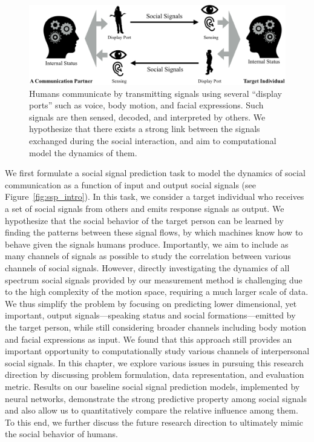 \begin{figure}[t]
	\includegraphics[width=\linewidth]{ssp_fig/socialcomm}
	\caption{Humans communicate by transmitting signals using several ``display ports'' such as voice, body motion, and facial expressions. Such signals are then sensed, decoded, and interpreted by others. We hypothesize that there exists a strong link between the signals exchanged during the social interaction, and aim to computational model the dynamics of them.}
	\label{fig:ssp_intro_flow}
\end{figure}

We first formulate a social signal prediction task to model the dynamics of social communication as a function of input and output social signals (see Figure~\ref{fig:ssp_intro}). In this task, we consider a target individual who receives a set of social signals from others and emits response signals as output. We hypothesize that the social behavior of the target person can be learned by finding the patterns between these signal flows, by which machines know how to behave given the signals humans produce. Importantly, we aim to include as many channels of signals as possible to study the correlation between various channels of social signals. However, directly investigating the dynamics of all spectrum social signals provided by our measurement method is challenging due to the high complexity of the motion space, requiring a much larger scale of data. We thus simplify the problem by focusing on predicting lower dimensional, yet important, output signals---speaking status and social formations---emitted by the target person, while still considering broader channels including body motion and facial expressions as input. We found that this approach still provides an important opportunity to computationally study various channels of interpersonal social signals. In this chapter, we explore various issues in pursuing this research direction by discussing problem formulation, data representation, and evaluation metric. Results on our baseline social signal prediction models, implemented by neural networks, demonstrate the strong predictive property among social signals and also allow us to quantitatively compare the relative influence among them. To this end, we further discuss the future research direction to ultimately mimic the social behavior of humans.



